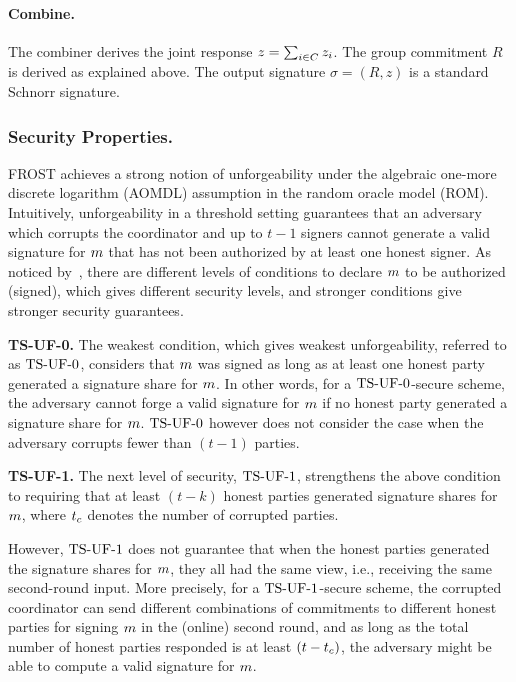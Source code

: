 \paragraph{Combine.}
The combiner derives the joint response $z = \sum_{i \in C} z_i$.
The group commitment $R$ is derived as explained above.
The output signature $\sigma = (R,z)$ is a standard Schnorr signature.

\subsubsection{Security Properties.}
FROST achieves a strong notion of unforgeability under the algebraic one-more discrete logarithm (AOMDL) assumption in the random oracle model (ROM).
Intuitively, unforgeability in a threshold setting guarantees that an adversary which corrupts the coordinator and up to $t-1$ signers cannot generate a valid signature for $m$ that has not been authorized by at least one honest signer.
As noticed by~\cite{BellareCKMTZ22}, there are different levels of conditions to declare $m$ to be authorized (signed), which gives different security levels, and stronger conditions give stronger security guarantees.


\medskip

\textbf{TS-UF-0.} The weakest condition, which gives weakest unforgeability, referred to as $\mathrm{TS}\mbox{-}\mathrm{UF}\mbox{-}{0}$, considers that $m$ was signed as long as at least one honest party generated a signature share for $m$. In other words, for a $\mathrm{TS}\mbox{-}\mathrm{UF}\mbox{-}{0}$-secure scheme, the adversary cannot forge a valid signature for $m$ if no honest party generated a signature share for $m$.
$\mathrm{TS}\mbox{-}\mathrm{UF}\mbox{-}{0}$ however does not consider the case when the adversary corrupts fewer than $(t-1)$ parties.

\medskip

\textbf{TS-UF-1.} The next level of security, $\mathrm{TS}\mbox{-}\mathrm{UF}\mbox{-}{1}$, strengthens the above condition to requiring that at least $(t - k)$ honest parties generated signature shares for $m$,
where $t_c$ denotes the number of corrupted parties.

However, $\mathrm{TS}\mbox{-}\mathrm{UF}\mbox{-}{1}$ does not guarantee that when the honest parties generated the signature shares for $m$, they all had the same view, i.e., receiving the same second-round input.
More precisely, for a $\mathrm{TS}\mbox{-}\mathrm{UF}\mbox{-}{1}$-secure scheme, the corrupted coordinator can send different combinations of commitments to different honest parties for signing $m$ in the (online) second round,
and as long as the total number of honest parties responded is at least $(t-t_c)$, the adversary might be able to compute a valid signature for $m$.

